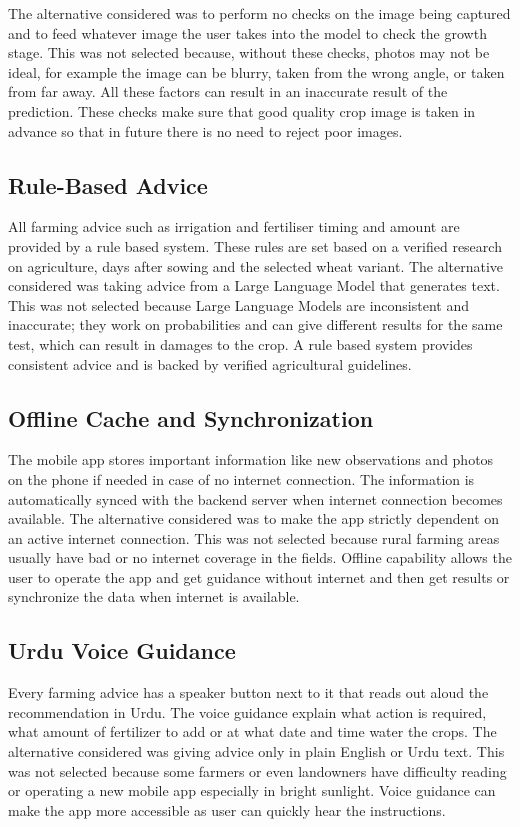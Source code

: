 \documentclass{FastFyp}
\begin{document}
The alternative considered was to perform no checks on the image being
captured and to feed whatever image the user takes into the model to check the
growth stage. This was not selected because, without these checks, photos may
not be ideal, for example the image can be blurry, taken from the wrong angle,
or taken from far away. All these factors can result in an inaccurate result
of the prediction. These checks make sure that good quality crop image is
taken in advance so that in future there is no need to reject poor images.

\subsection{Rule-Based Advice}
All farming advice such as irrigation and fertiliser timing and amount are
provided by a rule based system. These rules are set based on a verified
research on agriculture, days after sowing and the selected wheat variant.
The alternative considered was taking advice from a Large Language Model
that generates text. This was not selected because Large Language Models are
inconsistent and inaccurate; they work on probabilities and can give different
results for the same test, which can result in damages to the crop. A rule
based system provides consistent advice and is backed by verified agricultural
guidelines.

\subsection{Offline Cache and Synchronization}
The mobile app stores important information like new observations and photos
on the phone if needed in case of no internet connection. The information is
automatically synced with the backend server when internet connection becomes
available. The alternative considered was to make the app strictly dependent on an active
internet connection. This was not selected because rural farming areas usually
have bad or no internet coverage in the fields. Offline capability allows the
user to operate the app and get guidance without internet and then get results
or synchronize the data when internet is available.

\subsection{Urdu Voice Guidance}
Every farming advice has a speaker button next to it that reads out aloud the
recommendation in Urdu. The voice guidance explain what action is required,
what amount of fertilizer to add or at what date and time water the crops.
The alternative considered was giving advice only in plain English or Urdu
text. This was not selected because some farmers or even landowners have
difficulty reading or operating a new mobile app especially in bright
sunlight. Voice guidance can make the app more accessible as user can quickly
hear the instructions.
\end{document}
